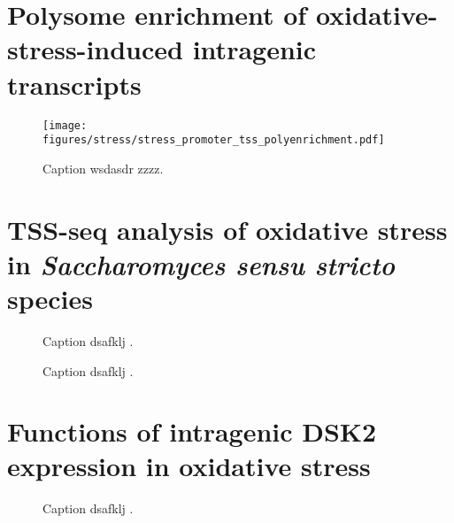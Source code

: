 \section{Polysome enrichment of oxidative-stress-induced intragenic transcripts}

\lipsum[1]

\begin{figure}
\texttt{[image: figures/stress/stress\_promoter\_tss\_polyenrichment.pdf]}
\caption[Polysome enrichment in oxidative stress, for oxidative-stress-induced genic and intragenic promoters.]{Caption wsdasdr zzzz.}
\label{fig:stress_promoter_tss_polyenrichment}
\end{figure}

\section{TSS-seq analysis of oxidative stress in \textit{Saccharomyces sensu stricto} species}

\lipsum[1]

\begin{figure}
\caption[A figure showing TSS-seq coverage over oxidative-stress-induced TSSs in the three species.]{Caption dsafklj .}
\end{figure}

\begin{figure}
\caption[A figure showing TSS-seq coverage over DSK2 in the three species, possibly with the corresponding northern blot.]{Caption dsafklj .}
\end{figure}

\section{Functions of intragenic DSK2 expression in oxidative stress}

\lipsum[1]

\begin{figure}
\caption[A figure showing TSS-seq, TFIIB ChIP-nexus, and MNase-ChIP-seq at DSK2.]{Caption dsafklj .}
\end{figure}

